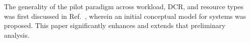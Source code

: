 \documentclass{sig-alternate}
\begin{document}


The generality of the pilot paradigm across workload, DCR, and resource types
was first discussed in Ref.~\cite{luckow2012}, wherein an initial conceptual
model for \pilot systems was proposed. This paper significantly enhances and
extends that preliminary analysis.

 




\end{document}
